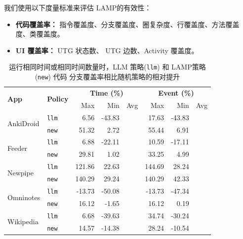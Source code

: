 \documentclass[twocolumn, 10pt]{article}
\newcommand{\lamp}{L{\small\MakeUppercase{amp}}}
\begin{document}
我们使用以下度量标准来评估 \lamp 的有效性：

\begin{itemize}[noitemsep]
    \item \textbf{代码覆盖率：} 指令覆盖度、分支覆盖度、圈复杂度、行覆盖度、方法覆盖度、类覆盖度。
    \item \textbf{UI 覆盖率：} UTG 状态数、 UTG 边数、Activity 覆盖度。
\end{itemize}

\begin{table}[ht]
\centering
\small
\begin{tabular}{llrrrrrr}
\toprule
\multirow{2}{*}{\textbf{App}} & \multirow{2}{*}{\textbf{Policy}} & \multicolumn{3}{c}{\textbf{Time (\%)}} & \multicolumn{3}{c}{\textbf{Event (\%)}} \\
\cmidrule(lr){3-5} \cmidrule(lr){6-8}
& & Max & Min & Avg & Max & Min & Avg \\
\midrule

\multirow{2}{*}{AnkiDroid} 
    & \texttt{llm}  & 6.56  & {-43.83} & \cellcolor{gray!20}{-18.69} & 17.63 & {-43.83} & \cellcolor{gray!20}{-10.45} \\
    & \texttt{new}  & {51.32} & {2.72}   & \cellcolor{gray!20}{32.22}  & {55.44} & {6.91}   & \cellcolor{gray!20}{36.28}  \\
\midrule

\multirow{2}{*}{Feeder} 
    & \texttt{llm}  & 6.88  & {-22.11} & \cellcolor{gray!20}{-15.54} & 10.59 & {-17.11} & \cellcolor{gray!20}{-11.76} \\
    & \texttt{new}  & {29.81} & {1.02}   & \cellcolor{gray!20}{15.87}  & {33.25} & {4.99}   & \cellcolor{gray!20}{22.54}  \\
\midrule

\multirow{2}{*}{Newpipe} 
    & \texttt{llm}  & {121.86} & {22.63}  & \cellcolor{gray!20}{32.71}  & 144.69 & 28.24  & \cellcolor{gray!20}{41.09}  \\
    & \texttt{new}  & {140.29} & {29.24}  & \cellcolor{gray!20}{44.10}  & {140.29} & {42.33}  & \cellcolor{gray!20}{51.83}  \\
\midrule

\multirow{2}{*}{Omninotes} 
    & \texttt{llm}  & -13.73 & {-50.08} & \cellcolor{gray!20}{-39.31} & -13.73 & {-47.34} & \cellcolor{gray!20}{-35.73} \\
    & \texttt{new}  & {16.12}  & {-1.65}  & \cellcolor{gray!20}{3.55}   & {16.12}  & {0.19}   & \cellcolor{gray!20}{9.44}   \\
\midrule

\multirow{2}{*}{Wikipedia} 
    & \texttt{llm}  & 6.68   & {-39.63} & \cellcolor{gray!20}{-15.34} & {34.74}  & -30.24 & \cellcolor{gray!20}{-0.58}  \\
    & \texttt{new}  & {14.57}  & {-14.38} & \cellcolor{gray!20}{1.97}   & 28.24  & {-10.54} & \cellcolor{gray!20}{17.27}  \\
\bottomrule
\end{tabular}
\caption{运行相同时间或相同时间数量时，LLM 策略(\texttt{llm}) 和 \lamp 策略(\texttt{new}) 代码 分支覆盖率相比随机策略的相对提升}
\label{tab:branch-coverage-improvement}
\end{table}
\end{document}
